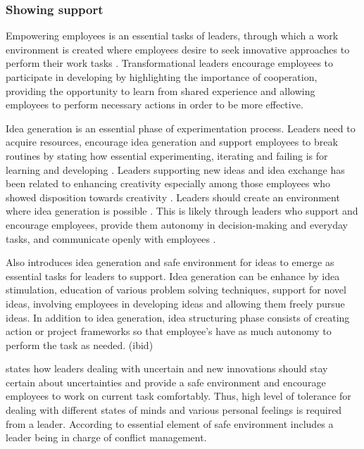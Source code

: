 \subsubsection*{Showing support}
Empowering employees is an essential tasks of leaders, through which a work environment is created where employees desire to seek innovative approaches to perform their work tasks \citep{jung2003role}. Transformational leaders encourage employees to participate in developing by highlighting the importance of cooperation, providing the opportunity to learn from shared experience and allowing employees to perform necessary actions in order to be more effective\citep{bass1990implications}. 

Idea generation is an essential phase of experimentation process.  Leaders need to acquire resources, encourage idea generation \citep{mcgourty1996managing} and support employees to break routines by stating how essential experimenting, iterating and failing is for learning and developing \citep{amabile2008creativity,shalley2004leaders}. Leaders supporting new ideas and idea exchange has been related to enhancing creativity especially among those employees who showed disposition towards creativity \citep{oldham1996employee}.  Leaders should create an environment where idea generation is possible \citep{andrews1970social}. This is likely through leaders who support and encourage employees, provide them autonomy in decision-making and everyday tasks, and communicate openly with employees \citep{oldham1996employee,tierney1999examination}. 

Also \citet{mumford2002leading} introduces idea generation and safe environment for ideas to emerge as essential tasks for leaders to support. Idea generation can be enhance by idea stimulation, education of various problem solving techniques, support for novel ideas, involving employees in developing ideas and allowing them freely pursue ideas. In addition to idea generation, idea structuring phase consists of creating action or project frameworks so that employee's have as much autonomy to perform the task as needed. (ibid)

\citet{buijs2007innovation} states how leaders dealing with uncertain and new innovations should stay certain about uncertainties and provide a safe environment and encourage employees to work on current task comfortably. Thus, high level of tolerance for dealing with different states of minds and various personal feelings is required from a leader. \citep{buijs2007innovation} According to \citet{mumford2002leading} essential element of safe environment includes a leader being in charge of conflict management.


